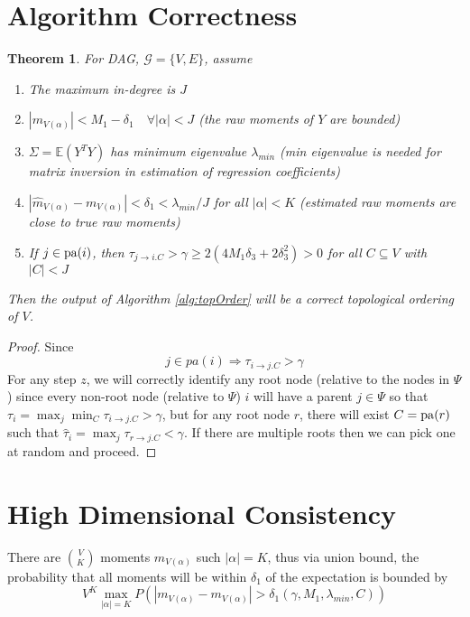 \documentclass[]{article}
\newtheorem{theorem}{Theorem}
\newcommand{\E}{\mathbb{E}}
\newcommand{\pa}{{\rm pa}}       %
\begin{document}
\section{Algorithm Correctness}

\begin{theorem}
For DAG, $\mathcal{G} = \{V,E\}$, assume
\begin{enumerate}
\item The maximum in-degree is $J$
\item $|m_{V(\alpha)}| < M_1 - \delta_1 \quad \forall |\alpha| < J$ (the raw moments of $Y$ are bounded)
\item $\Sigma = \E(Y^T Y)$ has minimum eigenvalue $\lambda_{min}$ (min eigenvalue is needed for matrix inversion in estimation of regression coefficients)
\item $|\hat m_{V(\alpha)} - m_{V(\alpha)}| < \delta_1 < \lambda_{min}/J$ for all $|\alpha| < K$ (estimated raw moments are close to true raw moments)
\item If $j \in \pa(i)$, then $\tau_{j\rightarrow i.C} > \gamma   \geq 2 \left(4M_1\delta_3 + 2\delta_3^2\right) > 0$ for all $C \subseteq V$ with $|C| < J$
\end{enumerate}

Then the output of Algorithm \ref{alg:topOrder} will be a correct topological ordering of $V$.
\end{theorem}

\begin{proof}
Since
\begin{equation}
j \in pa(i) \Rightarrow \tau_{i\rightarrow j.C} > \gamma
\end{equation}
For any step $z$, we will correctly identify any root node (relative to the nodes in $\Psi$) since every non-root node (relative to $\Psi$) $i$ will have a parent $j \in \Psi$ so that $\tau_i = \max_j \min_C \tau_{i\rightarrow j.C} > \gamma$, but for any root node $r$, there will exist $C = \pa(r)$ such that $\hat \tau_i = \max_j \tau_{r\rightarrow j.C} < \gamma$. If there are multiple roots then we can pick one at random and proceed.
\end{proof}

\section{High Dimensional Consistency}
There are ${V \choose K}$ moments $m_{V(\alpha)}$ such $|\alpha| = K$, thus via union bound, the probability that all moments will be within $\delta_1$ of the expectation is bounded by
\[ V^K \max_{|\alpha| = K}P\left(|m_{V(\alpha)} - m_{V(\alpha)}| > \delta_1(\gamma, M_1, \lambda_{min}, C)\right) \]
\end{document}

